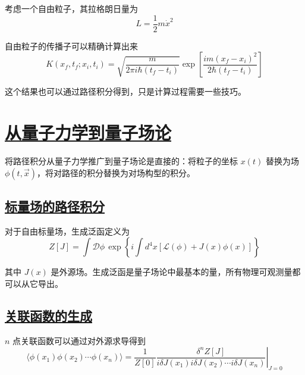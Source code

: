 \begin{example}[自由粒子的路径积分]
    考虑一个自由粒子，其拉格朗日量为
    \begin{equation*}
        L = \frac{1}{2}m\dot{x}^2
    \end{equation*}

    自由粒子的传播子可以精确计算出来
    \begin{equation*}
        K(x_f, t_f; x_i, t_i) = \sqrt{\frac{m}{2\pi i\hbar(t_f-t_i)}} \exp\left[\frac{im(x_f-x_i)^2}{2\hbar(t_f-t_i)}\right]
    \end{equation*}

    这个结果也可以通过路径积分得到，只是计算过程需要一些技巧。
\end{example}

\section{\protect\hyperlink{:}{从量子力学到量子场论}}

将路径积分从量子力学推广到量子场论是直接的：将粒子的坐标 $x(t)$ 替换为场 $\phi(t, \vec{x})$，将对路径的积分替换为对场构型的积分。

\subsection{\protect\hyperlink{:}{标量场的路径积分}}

对于自由标量场，生成泛函定义为
\begin{equation}
    Z[J] = \int \mathcal{D}\phi \, \exp\left\{i\int d^4x \left[\mathcal{L}(\phi) + J(x)\phi(x)\right]\right\}
\end{equation}

其中 $J(x)$ 是外源场。生成泛函是量子场论中最基本的量，所有物理可观测量都可以从它导出。

\subsection{\protect\hyperlink{:}{关联函数的生成}}

$n$ 点关联函数可以通过对外源求导得到
\begin{equation}
    \langle\phi(x_1)\phi(x_2)\cdots\phi(x_n)\rangle = \frac{1}{Z[0]} \left.\frac{\delta^n Z[J]}{i\delta J(x_1) i\delta J(x_2) \cdots i\delta J(x_n)}\right|_{J=0}
\end{equation}

